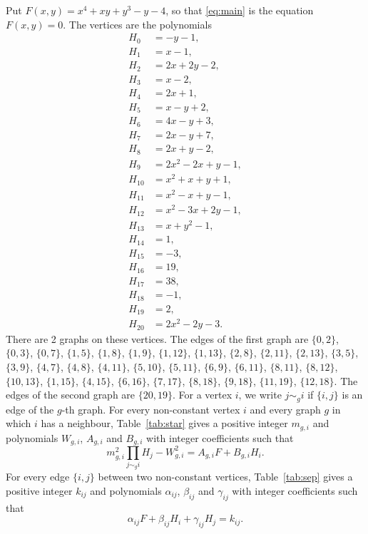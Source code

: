 \documentclass[11pt]{article}
\begin{document}
Put $F(x,y)=x^{4}+xy+y^{3}-y-4$, so that \eqref{eq:main} is the equation $F(x,y)=0$. The vertices are the polynomials
\begin{align*}
H_{0}&=-y-1,\\
H_{1}&=x-1,\\
H_{2}&=2x+2y-2,\\
H_{3}&=x-2,\\
H_{4}&=2x+1,\\
H_{5}&=x-y+2,\\
H_{6}&=4x-y+3,\\
H_{7}&=2x-y+7,\\
H_{8}&=2x+y-2,\\
H_{9}&=2x^{2}-2x+y-1,\\
H_{10}&=x^{2}+x+y+1,\\
H_{11}&=x^{2}-x+y-1,\\
H_{12}&=x^{2}-3x+2y-1,\\
H_{13}&=x+y^{2}-1,\\
H_{14}&=1,\\
H_{15}&=-3,\\
H_{16}&=19,\\
H_{17}&=38,\\
H_{18}&=-1,\\
H_{19}&=2,\\
H_{20}&=2x^{2}-2y-3.
\end{align*}
There are 2 graphs on these vertices. The edges of the first graph are $\{0,2\}$, $\{0,3\}$, $\{0,7\}$, $\{1,5\}$, $\{1,8\}$, $\{1,9\}$, $\{1,12\}$, $\{1,13\}$, $\{2,8\}$, $\{2,11\}$, $\{2,13\}$, $\{3,5\}$, $\{3,9\}$, $\{4,7\}$, $\{4,8\}$, $\{4,11\}$, $\{5,10\}$, $\{5,11\}$, $\{6,9\}$, $\{6,11\}$, $\{8,11\}$, $\{8,12\}$, $\{10,13\}$, $\{1,15\}$, $\{4,15\}$, $\{6,16\}$, $\{7,17\}$, $\{8,18\}$, $\{9,18\}$, $\{11,19\}$, $\{12,18\}$. The edges of the second graph are $\{20,19\}$. For a vertex $i$, we write $j\sim_g i$ if $\{i,j\}$ is an edge of the $g$-th graph.
For every non-constant vertex $i$ and every graph $g$ in which $i$ has a neighbour, Table~\ref{tab:star} gives a positive integer $m_{g,i}$ and polynomials $W_{g,i}$, $A_{g,i}$ and $B_{g,i}$ with integer coefficients such that
\begin{equation}\label{eq:star}
m_{g,i}^2\prod_{j\sim_g i}H_j-W_{g,i}^2=A_{g,i}F+B_{g,i}H_i.
\end{equation}
For every edge $\{i,j\}$ between two non-constant vertices, Table~\ref{tab:sep} gives a positive integer $k_{ij}$ and polynomials $\alpha_{ij}$, $\beta_{ij}$ and $\gamma_{ij}$ with integer coefficients such that
\begin{equation}\label{eq:sep}
\alpha_{ij}F+\beta_{ij}H_i+\gamma_{ij}H_j=k_{ij}.
\end{equation}
\end{document}
